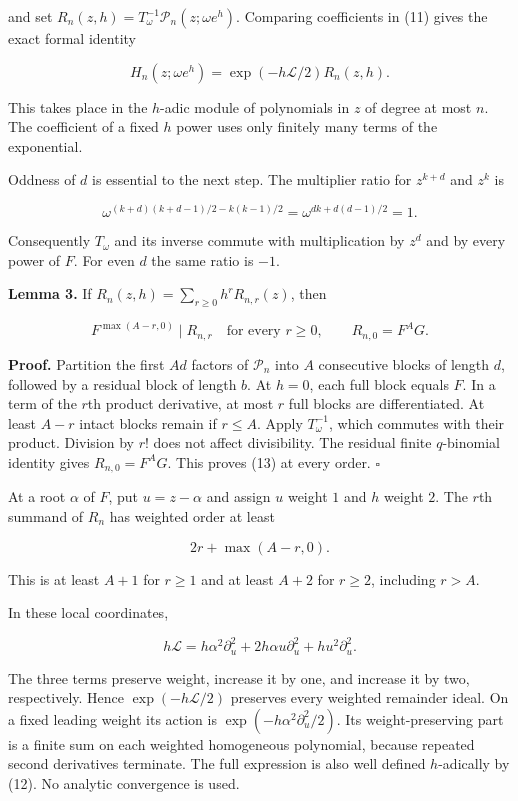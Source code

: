\documentclass[
  11pt,
]{article}
\begin{document}
and set \(R_n(z,h)=T_\omega^{-1}\mathcal P_n(z;\omega e^h)\). Comparing
coefficients in (11) gives the exact formal identity

\[
H_n(z;\omega e^h)=\exp(-h\mathcal L/2)R_n(z,h). \tag{12}
\]

This takes place in the \(h\)-adic module of polynomials in \(z\) of
degree at most \(n\). The coefficient of a fixed \(h\) power uses only
finitely many terms of the exponential.

Oddness of \(d\) is essential to the next step. The multiplier ratio for
\(z^{k+d}\) and \(z^k\) is

\[
\omega^{(k+d)(k+d-1)/2-k(k-1)/2}
=\omega^{dk+d(d-1)/2}=1.
\]

Consequently \(T_\omega\) and its inverse commute with multiplication by
\(z^d\) and by every power of \(F\). For even \(d\) the same ratio is
\(-1\).

\textbf{Lemma 3.} If \(R_n(z,h)=\sum_{r\geq0}h^rR_{n,r}(z)\), then

\[
F^{\max(A-r,0)}\mid R_{n,r}\quad\text{for every }r\geq0,
\qquad R_{n,0}=F^AG. \tag{13}
\]

\textbf{Proof.} Partition the first \(Ad\) factors of \(\mathcal P_n\)
into \(A\) consecutive blocks of length \(d\), followed by a residual
block of length \(b\). At \(h=0\), each full block equals \(F\). In a
term of the \(r\)th product derivative, at most \(r\) full blocks are
differentiated. At least \(A-r\) intact blocks remain if \(r\leq A\).
Apply \(T_\omega^{-1}\), which commutes with their product. Division by
\(r!\) does not affect divisibility. The residual finite \(q\)-binomial
identity gives \(R_{n,0}=F^AG\). This proves (13) at every order.
\(\square\)

At a root \(\alpha\) of \(F\), put \(u=z-\alpha\) and assign \(u\)
weight \(1\) and \(h\) weight \(2\). The \(r\)th summand of \(R_n\) has
weighted order at least

\[
2r+\max(A-r,0). \tag{14}
\]

This is at least \(A+1\) for \(r\geq1\) and at least \(A+2\) for
\(r\geq2\), including \(r>A\).

In these local coordinates,

\[
h\mathcal L=h\alpha^2\partial_u^2
+2h\alpha u\partial_u^2+hu^2\partial_u^2. \tag{15}
\]

The three terms preserve weight, increase it by one, and increase it by
two, respectively. Hence \(\exp(-h\mathcal L/2)\) preserves every
weighted remainder ideal. On a fixed leading weight its action is
\(\exp(-h\alpha^2\partial_u^2/2)\). Its weight-preserving part is a
finite sum on each weighted homogeneous polynomial, because repeated
second derivatives terminate. The full expression is also well defined
\(h\)-adically by (12). No analytic convergence is used.
\end{document}

